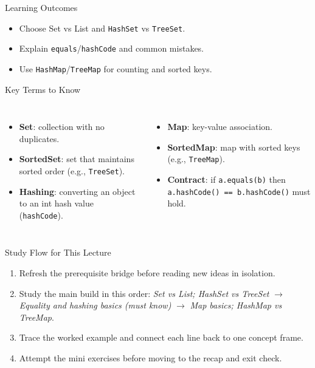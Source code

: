 \documentclass{beamer}
\begin{document}
\begin{frame}{Learning Outcomes}
  \begin{itemize}[<+->]
    \item Choose Set vs List and \texttt{HashSet} vs \texttt{TreeSet}.
    \item Explain \texttt{equals}/\texttt{hashCode} and common mistakes.
    \item Use \texttt{HashMap}/\texttt{TreeMap} for counting and sorted keys.
  \end{itemize}
  \slidesources{\OOPSUnitVSources}
\end{frame}

\begin{frame}{Key Terms to Know}
\small
\begin{columns}[t]
\begin{itemize}
  \item \textbf{Set}: collection with no duplicates.
  \item \textbf{SortedSet}: set that maintains sorted order (e.g., \texttt{TreeSet}).
  \item \textbf{Hashing}: converting an object to an int hash value (\texttt{hashCode}).
\end{itemize}
\begin{itemize}
  \item \textbf{Map}: key-value association.
  \item \textbf{SortedMap}: map with sorted keys (e.g., \texttt{TreeMap}).
  \item \textbf{Contract}: if \texttt{a.equals(b)} then \texttt{a.hashCode() == b.hashCode()} must hold.
\end{itemize}
\end{columns}
  \slidesources{\OOPSUnitVSources}
\end{frame}

\begin{frame}{Study Flow for This Lecture}
\begin{enumerate}[<+->]
  \item Refresh the prerequisite bridge before reading new ideas in isolation.
  \item Study the main build in this order: \textit{Set vs List; HashSet vs TreeSet} $\rightarrow$ \textit{Equality and hashing basics (must know)} $\rightarrow$ \textit{Map basics; HashMap vs TreeMap}.
  \item Trace the worked example and connect each line back to one concept frame.
  \item Attempt the mini exercises before moving to the recap and exit check.
\end{enumerate}
  \slidesources{\OOPSUnitVSources}
\end{frame}
\end{document}
